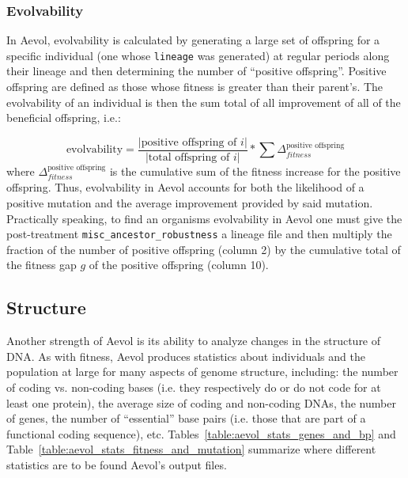 \subsubsection{Evolvability}
In Aevol, evolvability is calculated by generating a large set of offspring for a specific individual (one whose \texttt{lineage} was generated) at regular periods along their lineage and then determining the number of ``positive offspring''. Positive offspring are defined as those whose fitness is greater than their parent's. The evolvability of an individual is then the sum total of all improvement of all of the beneficial offspring, i.e.:

\begin{equation*}
\text{evolvability} = \frac{|\text{positive offspring of }i|}{|\text{total offspring of }i|}*\sum \Delta^{\text{positive offspring}}_{fitness}
\end{equation*}  where $\Delta^{\text{positive offspring}}_{fitness}$ is the cumulative sum of the fitness increase for the positive offspring. Thus, evolvability in Aevol accounts for both the likelihood of a positive mutation and the average improvement provided by said mutation. Practically speaking, to find an organisms evolvability in Aevol one must give the post-treatment \texttt{misc\_ancestor\_robustness} a lineage file and then multiply the fraction of the number of positive offspring (column 2) by the cumulative total of the fitness gap $g$ of the positive offspring (column 10).


 
\subsection{Structure}\label{methods:structure}
Another strength of Aevol is its ability to analyze changes in the structure of DNA. As with fitness, Aevol produces statistics about individuals and the population at large for many aspects of genome structure, including: the number of coding vs. non-coding bases (i.e. they respectively do or do not code for at least one protein), the average size of coding and non-coding DNAs, the number of genes, the number of ``essential'' base pairs (i.e. those that are part of a functional coding sequence), etc. Tables~\ref{table:aevol_stats_genes_and_bp} and Table~\ref{table:aevol_stats_fitness_and_mutation} summarize where different statistics are to be found Aevol's output files. 

